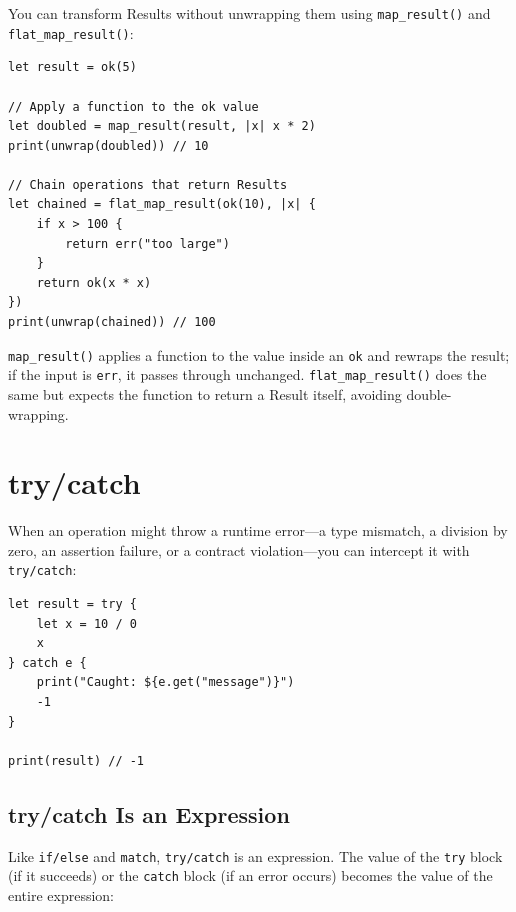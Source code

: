 You can transform Results without unwrapping them using \lstinline|map_result()| and \lstinline|flat_map_result()|:

\begin{lstlisting}[language=Lattice, caption={Transforming Results}]
let result = ok(5)

// Apply a function to the ok value
let doubled = map_result(result, |x| x * 2)
print(unwrap(doubled)) // 10

// Chain operations that return Results
let chained = flat_map_result(ok(10), |x| {
    if x > 100 {
        return err("too large")
    }
    return ok(x * x)
})
print(unwrap(chained)) // 100
\end{lstlisting}

\lstinline|map_result()| applies a function to the value inside an \lstinline|ok| and rewraps the result; if the input is \lstinline|err|, it passes through unchanged. \lstinline|flat_map_result()| does the same but expects the function to return a Result itself, avoiding double-wrapping.

\section{try/catch}\label{sec:try-catch}

When an operation might throw a runtime error---a type mismatch, a division by zero, an assertion failure, or a contract violation---you can intercept it with \lstinline|try/catch|:

\begin{lstlisting}[language=Lattice, caption={Basic try/catch}]
let result = try {
    let x = 10 / 0
    x
} catch e {
    print("Caught: ${e.get("message")}")
    -1
}

print(result) // -1
\end{lstlisting}

\subsection{try/catch Is an Expression}\label{sec:try-catch-expression}

Like \lstinline|if/else| and \lstinline|match|, \lstinline|try/catch| is an expression. The value of the \lstinline|try| block (if it succeeds) or the \lstinline|catch| block (if an error occurs) becomes the value of the entire expression:

